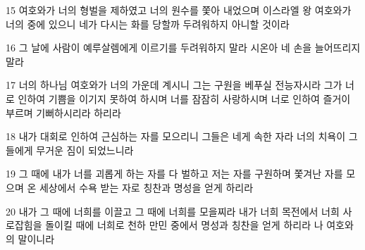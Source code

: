\par 15 여호와가 너의 형벌을 제하였고 너의 원수를 쫓아 내었으며 이스라엘 왕 여호와가 너의 중에 있으니 네가 다시는 화를 당할까 두려워하지 아니할 것이라
\par 16 그 날에 사람이 예루살렘에게 이르기를 두려워하지 말라 시온아 네 손을 늘어뜨리지 말라
\par 17 너의 하나님 여호와가 너의 가운데 계시니 그는 구원을 베푸실 전능자시라 그가 너로 인하여 기쁨을 이기지 못하여 하시며 너를 잠잠히 사랑하시며 너로 인하여 즐거이 부르며 기뻐하시리라 하리라
\par 18 내가 대회로 인하여 근심하는 자를 모으리니 그들은 네게 속한 자라 너의 치욕이 그들에게 무거운 짐이 되었느니라
\par 19 그 때에 내가 너를 괴롭게 하는 자를 다 벌하고 저는 자를 구원하며 쫓겨난 자를 모으며 온 세상에서 수욕 받는 자로 칭찬과 명성을 얻게 하리라
\par 20 내가 그 때에 너희를 이끌고 그 때에 너희를 모을찌라 내가 너희 목전에서 너희 사로잡힘을 돌이킬 때에 너희로 천하 만민 중에서 명성과 칭찬을 얻게 하리라 나 여호와의 말이니라


